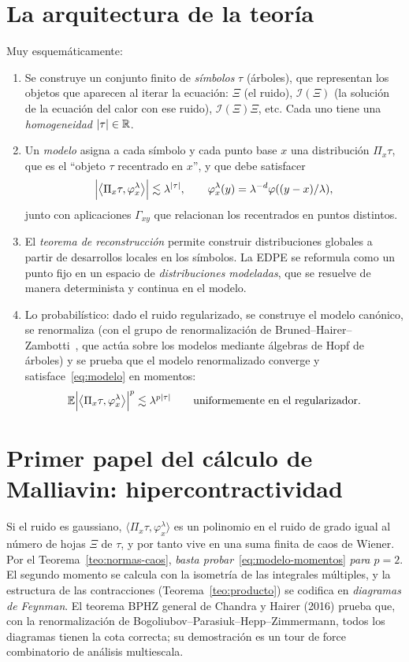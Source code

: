 \section{La arquitectura de la teoría}
Muy esquemáticamente:
\begin{enumerate}
  \item Se construye un conjunto finito de \emph{símbolos} $\tau$ (árboles), que representan los objetos que
  aparecen al iterar la ecuación: $\Xi$ (el ruido), $\mathcal I(\Xi)$ (la solución de la ecuación del calor con
  ese ruido), $\mathcal I(\Xi)\Xi$, etc. Cada uno tiene una \emph{homogeneidad} $\left\lvert \tau\right\rvert\in\mathbb{R}$.
  \item Un \emph{modelo} asigna a cada símbolo y cada punto base $x$ una distribución $\Pi_x\tau$, que es el
  ``objeto $\tau$ recentrado en $x$'', y que debe satisfacer
  \begin{equation}\label{eq:modelo}
    \Big|\big\langle\Pi_x\tau,\varphi^\lambda_x\big\rangle\Big|\lesssim\lambda^{\left\lvert \tau\right\rvert},\qquad\varphi^\lambda_x(y)=\lambda^{-d}\varphi((y-x)/\lambda),
  \end{equation}
  junto con aplicaciones $\Gamma_{xy}$ que relacionan los recentrados en puntos distintos.
  \item El \emph{teorema de reconstrucción} permite construir distribuciones globales a partir de desarrollos
  locales en los símbolos. La EDPE se reformula como un punto fijo en un espacio de
  \emph{distribuciones modeladas}, que se resuelve de manera determinista y continua en el modelo.
  \item Lo probabilístico: dado el ruido regularizado, se construye el modelo canónico, se renormaliza
  (con el grupo de renormalización de Bruned--Hairer--Zambotti~\cite{BrunedHairerZambotti19}, que actúa sobre los
  modelos mediante álgebras de Hopf de árboles) y se prueba que el modelo renormalizado
  converge y satisface~\eqref{eq:modelo} en momentos:
  \begin{equation}\label{eq:modelo-momentos}
    \mathbb{E}\Big|\big\langle\Pi_x\tau,\varphi^\lambda_x\big\rangle\Big|^p\lesssim\lambda^{p\left\lvert \tau\right\rvert}\qquad\text{uniformemente en el regularizador.}
  \end{equation}
\end{enumerate}

\section{Primer papel del cálculo de Malliavin: hipercontractividad}
Si el ruido es gaussiano, $\big\langle\Pi_x\tau,\varphi^\lambda_x\big\rangle$ es un polinomio en el ruido de grado igual al número de
hojas $\Xi$ de $\tau$, y por tanto vive en una suma finita de caos de Wiener. Por el Teorema~\ref{teo:normas-caos},
\emph{basta probar}~\eqref{eq:modelo-momentos} \emph{para $p=2$}. El segundo momento se calcula con la isometría de las integrales
múltiples, y la estructura de las contracciones (Teorema~\ref{teo:producto}) se codifica en \emph{diagramas de Feynman}.
El teorema BPHZ general de Chandra y Hairer (2016) prueba que, con la renormalización
de Bogoliubov--Parasiuk--Hepp--Zimmermann, todos los diagramas tienen la cota correcta; su
demostración es un tour de force combinatorio de análisis multiescala.

